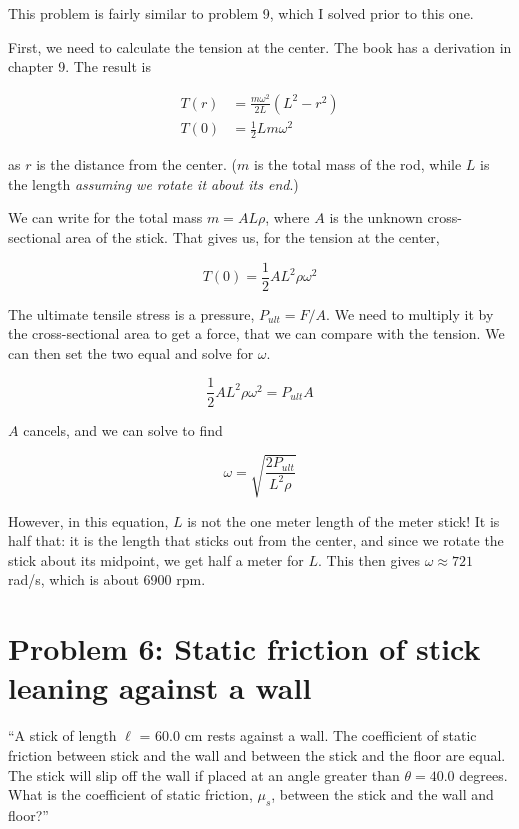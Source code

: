 \documentclass[8.01x]{subfiles}
\begin{document}
This problem is fairly similar to problem 9, which I solved prior to this one.

First, we need to calculate the tension at the center. The book has a derivation in chapter 9. The result is

\begin{align}
T(r) &= \frac{m \omega^2}{2L}(L^2 - r^2)\\
T(0) &= \frac{1}{2} L m \omega^2
\end{align}

as $r$ is the distance from the center. ($m$ is the total mass of the rod, while $L$ is the length \emph{assuming we rotate it about its end}.)

We can write for the total mass $m = A L \rho$, where $A$ is the unknown cross-sectional area of the stick. That gives us, for the tension at the center,

\begin{equation}
T(0) = \frac{1}{2} A L^2 \rho \omega^2
\end{equation}

The ultimate tensile stress is a pressure, $P_{ult} = F/A$. We need to multiply it by the cross-sectional area to get a force, that we can compare with the tension. We can then set the two equal and solve for $\omega$.

\begin{equation}
\frac{1}{2} A L^2 \rho \omega^2 = P_{ult} A
\end{equation}

$A$ cancels, and we can solve to find

\begin{equation}
\omega = \sqrt{\frac{2 P_{ult}}{L^2 \rho}}
\end{equation}

However, in this equation, $L$ is not the one meter length of the meter stick! It is half that: it is the length that sticks out from the center, and since we rotate the stick about its midpoint, we get half a meter for $L$. This then gives $\omega \approx 721$ rad/s, which is about 6900 rpm.

\section{Problem 6: Static friction of stick leaning against a wall}

``A stick of length $\ell$ = 60.0 cm rests against a wall. The coefficient of static friction between stick and the wall and between the stick and the floor are equal. The stick will slip off the wall if placed at an angle greater than $\theta = 40.0$ degrees. What is the coefficient of static friction, $\mu_s$, between the stick and the wall and floor?''
\end{document}
